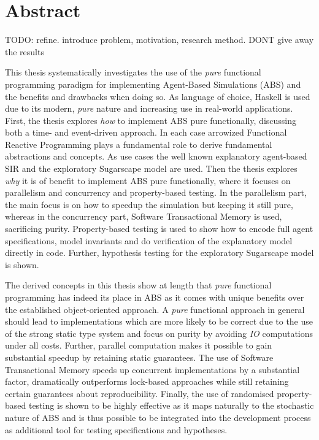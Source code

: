 \documentclass[oneside]{book}
\newcommand\blankpage{%
    \null
    \thispagestyle{empty}%
    \addtocounter{page}{-1}%
    \newpage}
\begin{document}
\cleardoublepage
\afterpage{\blankpage}

\clearpage
\tableofcontents

\newpage

\thispagestyle{plain}

\section*{Abstract}
TODO: refine. introduce problem, motivation, research method. DONT give away the results

This thesis systematically investigates the use of the \textit{pure} functional programming paradigm for implementing Agent-Based Simulations (ABS) and the benefits and drawbacks when doing so. As language of choice, Haskell is used due to its modern, \textit{pure} nature and increasing use in real-world applications. First, the thesis explores \textit{how} to implement ABS pure functionally, discussing both a time- and event-driven approach. In each case arrowized Functional Reactive Programming plays a fundamental role to derive fundamental abstractions and concepts. As use cases the well known explanatory agent-based SIR and the exploratory Sugarscape model are used. Then the thesis explores \textit{why} it is of benefit to implement ABS pure functionally, where it focuses on parallelism and concurrency and property-based testing. In the parallelism part, the main focus is on how to speedup the simulation but keeping it still pure, whereas in the concurrency part, Software Transactional Memory is used, sacrificing purity. Property-based testing is used to show how to encode full agent specifications, model invariants and do verification of the explanatory model directly in code. Further, hypothesis testing for the exploratory Sugarscape model is shown.

The derived concepts in this thesis show at length that \textit{pure} functional programming has indeed its place in ABS as it comes with unique benefits over the established object-oriented approach. A \textit{pure} functional approach in general should lead to implementations which are more likely to be correct due to the use of the strong static type system and focus on purity by avoiding \textit{IO} computations under all costs. Further, parallel computation makes it possible to gain substantial speedup by retaining static guarantees. The use of Software Transactional Memory speeds up concurrent implementations by a substantial factor, dramatically outperforms lock-based approaches while still retaining certain guarantees about reproducibility. Finally, the use of randomised property-based testing is shown to be highly effective as it maps naturally to the stochastic nature of ABS and is thus possible to be integrated into the development process as additional tool for testing specifications and hypotheses.
\end{document}
